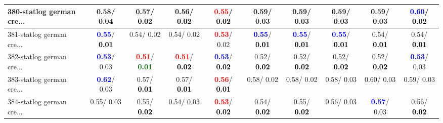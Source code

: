 \begin{table}[h]
\begin{center}
{\begin{tabular}{lc|c|c|c|c|c|c|c|c}
380-statlog german cre... &   0.58/  0.04 &   0.57/\textcolor{black}{\textbf{  0.02}} &   0.56/\textcolor{black}{\textbf{  0.02}} & \textcolor{red}{\textbf{  0.55}}/\textcolor{black}{\textbf{  0.02}} &   0.59/  0.03 &   0.59/  0.03 &   0.59/  0.03 &   0.59/  0.03 & \textcolor{blue}{\textbf{  0.60}}/\textcolor{black}{\textbf{  0.02}} \\ \hline
381-statlog german cre... & \textcolor{blue}{\textbf{  0.55}}/\textcolor{black}{\textbf{  0.01}} &   0.54/  0.02 &   0.54/  0.02 & \textcolor{red}{\textbf{  0.53}}/  0.02 & \textcolor{blue}{\textbf{  0.55}}/\textcolor{black}{\textbf{  0.01}} & \textcolor{blue}{\textbf{  0.55}}/\textcolor{black}{\textbf{  0.01}} & \textcolor{blue}{\textbf{  0.55}}/\textcolor{black}{\textbf{  0.01}} &   0.54/\textcolor{black}{\textbf{  0.01}} &   0.54/\textcolor{black}{\textbf{  0.01}} \\
382-statlog german cre... & \textcolor{blue}{\textbf{  0.53}}/  0.03 & \textcolor{red}{\textbf{  0.51}}/\textcolor{darkgreen}{\textbf{  0.01}} & \textcolor{red}{\textbf{  0.51}}/\textcolor{black}{\textbf{  0.02}} & \textcolor{blue}{\textbf{  0.53}}/\textcolor{black}{\textbf{  0.02}} &   0.52/\textcolor{black}{\textbf{  0.02}} &   0.52/\textcolor{black}{\textbf{  0.02}} &   0.52/\textcolor{black}{\textbf{  0.02}} &   0.52/\textcolor{black}{\textbf{  0.02}} & \textcolor{blue}{\textbf{  0.53}}/  0.03 \\
383-statlog german cre... & \textcolor{blue}{\textbf{  0.62}}/  0.03 &   0.57/\textcolor{black}{\textbf{  0.01}} &   0.57/\textcolor{black}{\textbf{  0.01}} & \textcolor{red}{\textbf{  0.56}}/\textcolor{black}{\textbf{  0.01}} &   0.58/  0.02 &   0.58/  0.02 &   0.58/  0.03 &   0.60/  0.03 &   0.59/  0.03 \\
384-statlog german cre... &   0.55/  0.03 &   0.55/\textcolor{black}{\textbf{  0.02}} &   0.54/  0.03 & \textcolor{red}{\textbf{  0.53}}/\textcolor{black}{\textbf{  0.02}} &   0.54/\textcolor{black}{\textbf{  0.02}} &   0.55/\textcolor{black}{\textbf{  0.02}} &   0.56/  0.03 & \textcolor{blue}{\textbf{  0.57}}/  0.03 &   0.56/\textcolor{black}{\textbf{  0.02}} \\\end{tabular}}\label{stratsALCKappa11Allallb}
\end{center}
\end{table}
